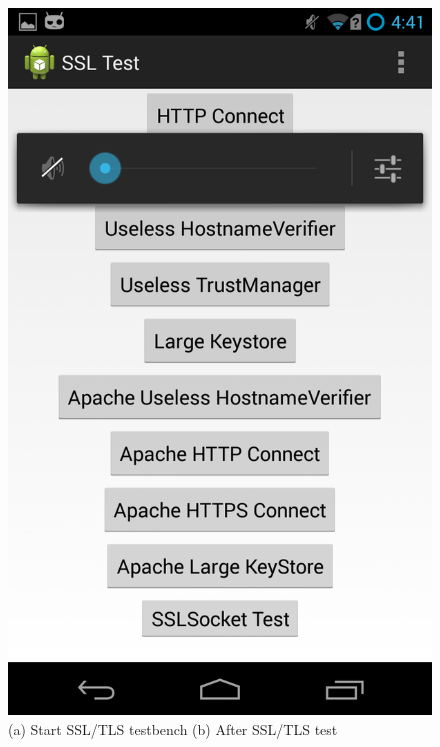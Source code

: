 \documentclass[a4paper, 12pt]{article}
\begin{document}
\begin{figure}[!htb]
\includegraphics[scale=.3]{imgs/impl/afterTest}\\
\scriptsize (a) Start SSL/TLS testbench \hspace{8em} (b) After SSL/TLS test
\end{figure}
\end{document}
